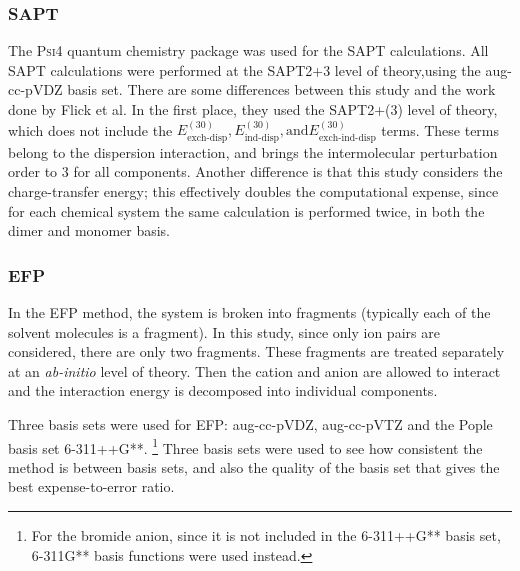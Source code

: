\begin{multicols}{2}



\subsubsection{SAPT}

The \textsc{Psi4} quantum chemistry package was used for the SAPT calculations. 
All SAPT calculations were performed at the SAPT2+3 level of theory,using the aug-cc-pVDZ basis set.
There are some differences between this study and the work done by Flick et al. 
In the first place, they used the SAPT2+(3) level of theory, which does not include the 
$E^{(30)}_{\text{exch-disp}}, E^{(30)}_{\text{ind-disp}}, \text{and}  E^{(30)}_{\text{exch-ind-disp}}$ 
terms. 
These terms belong to the dispersion interaction, and brings the intermolecular perturbation order to 3 for all components.
Another difference is that this study considers the charge-transfer energy; this effectively doubles the computational expense, since for each chemical system the same calculation is performed twice, in both the dimer and monomer basis.


\subsubsection{EFP}

In the EFP method, the system is broken into fragments (typically each of the solvent molecules is a fragment). 
In this study, since only ion pairs are considered, there are only two fragments. 
These fragments are treated separately at an \emph{ab-initio} level of theory. 
Then the cation and anion are allowed to interact and the interaction energy is decomposed into individual components.

Three basis sets were used for EFP: aug-cc-pVDZ, aug-cc-pVTZ and the Pople basis set 6-311++G**. 
\footnote{For the bromide anion, since it is not included in the 6-311++G** basis set, 6-311G** basis functions were used instead.}
Three basis sets were used to see how consistent the method is between basis sets, and also the quality of the basis set that gives the best expense-to-error ratio.


\end{multicols}

